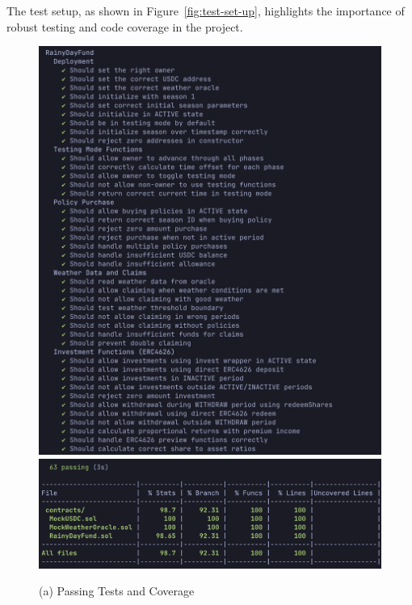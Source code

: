 \documentclass[11pt,a4paper]{article}
\begin{document}
    The test setup, as shown in Figure~\ref{fig:test-set-up}, highlights the importance of robust testing and code coverage in the project.

    \begin{figure}[H]
        \centering
        \begin{minipage}[b]{0.48\textwidth}
            \centering
            \includegraphics[width=0.95\linewidth]{graphics/Passing_Tests}
            \includegraphics[width=0.95\linewidth]{graphics/Test_Coverage}
            \caption*{(a) Passing Tests and Coverage}
        \end{minipage}\hfill
        \begin{minipage}[b]{0.48\textwidth}
            \centering

\end{minipage}
\end{figure}
\end{document}
